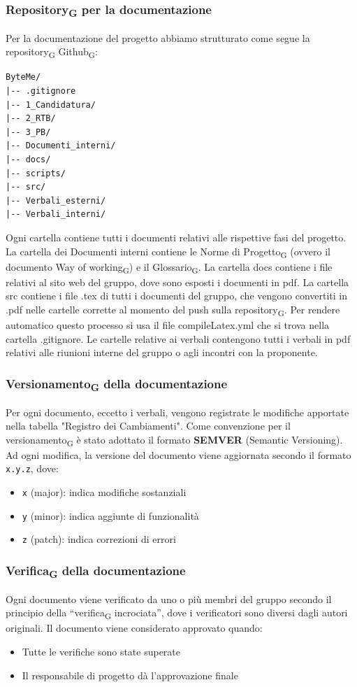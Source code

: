 \documentclass[11pt,a4paper]{article}
\newcommand{\gls}[1]{#1\textsubscript{G}}
\begin{document}
\subsubsection{\gls{Repository} per la documentazione}
Per la documentazione del progetto abbiamo strutturato come segue la \gls{repository} \gls{Github}:
\begin{verbatim}
ByteMe/
|-- .gitignore
|-- 1_Candidatura/
|-- 2_RTB/
|-- 3_PB/
|-- Documenti_interni/
|-- docs/
|-- scripts/
|-- src/
|-- Verbali_esterni/
|-- Verbali_interni/
\end{verbatim}

Ogni cartella contiene tutti i documenti relativi alle rispettive fasi del progetto.
La cartella dei Documenti interni contiene le \gls{Norme di Progetto} (ovvero il documento \gls{Way of working}) e il \gls{Glossario}.
La cartella docs contiene i file relativi al sito web del gruppo, dove sono esposti i documenti in pdf.
La cartella src contiene i file .tex di tutti i documenti del gruppo, che vengono convertiti in .pdf nelle cartelle corrette al momento del push sulla \gls{repository}. Per rendere automatico questo processo si usa il file compileLatex.yml che si trova nella cartella .gitignore.
Le cartelle relative ai verbali contengono tutti i verbali in pdf relativi alle riunioni interne del gruppo o agli incontri con la proponente.

\subsubsection{\gls{Versionamento} della documentazione}
Per ogni documento, eccetto i verbali, vengono registrate le modifiche apportate nella tabella "Registro dei Cambiamenti". 
Come convenzione per il \gls{versionamento} è stato adottato il formato \textbf{SEMVER} (Semantic Versioning). Ad ogni modifica, la versione del documento viene aggiornata secondo il formato \texttt{x.y.z}, dove:
\begin{itemize}
    \item \texttt{x} (major): indica modifiche sostanziali
    \item \texttt{y} (minor): indica aggiunte di funzionalità
    \item \texttt{z} (patch): indica correzioni di errori
\end{itemize}

\subsubsection{\gls{Verifica} della documentazione}
Ogni documento viene verificato da uno o più membri del gruppo secondo il principio della ``\gls{verifica} incrociata'', dove i verificatori sono diversi dagli autori originali.
Il documento viene considerato approvato quando:
\begin{itemize}
    \item Tutte le verifiche sono state superate
    \item Il responsabile di progetto dà l'approvazione finale
\end{itemize}
\end{document}
